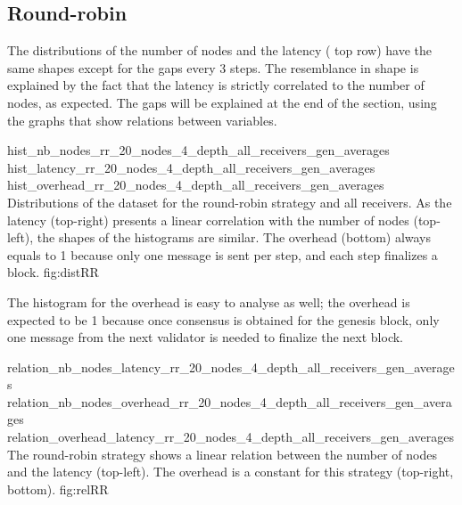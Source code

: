 \subsection{Round-robin}
\FloatBarrier

The distributions of the number of nodes and the latency
( top row) have the same
shapes except for the gaps every 3 steps. The resemblance in shape is explained
by the fact that the latency is strictly correlated to the number of nodes, as
expected.
The gaps will be explained at the end of the section, using the graphs that show
relations between variables.

\triplefigure
    {hist_nb_nodes_rr_20_nodes_4_depth_all_receivers_gen_averages}
    {hist_latency_rr_20_nodes_4_depth_all_receivers_gen_averages}
    {hist_overhead_rr_20_nodes_4_depth_all_receivers_gen_averages}
    {Distributions of the dataset for the round-robin strategy and all
    receivers. As the latency (top-right) presents a linear correlation with the number of
    nodes (top-left), the shapes of the histograms are similar. The overhead
    (bottom) always
    equals to 1 because only one message is sent per step, and each step
    finalizes a block.}
    {fig:distRR}

The histogram for the overhead is easy to analyse as well; the overhead is
expected to be 1 because once consensus is obtained for the genesis block, only
one message from the next validator is needed to finalize the next block.

\triplefigure
    {relation_nb_nodes_latency_rr_20_nodes_4_depth_all_receivers_gen_averages}
    {relation_nb_nodes_overhead_rr_20_nodes_4_depth_all_receivers_gen_averages}
    {relation_overhead_latency_rr_20_nodes_4_depth_all_receivers_gen_averages}
    {The round-robin strategy shows a linear relation between the number of
    nodes and the latency (top-left). The overhead is a constant for this
    strategy (top-right, bottom).}
    {fig:relRR}

